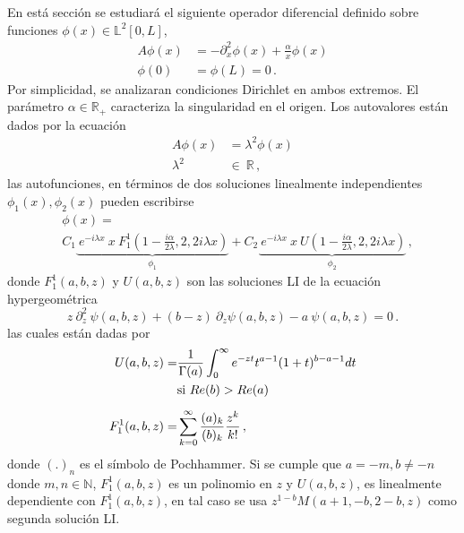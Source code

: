 En está sección se estudiará el siguiente operador diferencial definido sobre funciones $\phi (x)\in \mathbb{L} ^2 [0,L]$,
\begin{equation}
\begin{aligned}
    A \phi (x) &= - \partial ^2 _x  \phi(x) + \frac{\alpha}{x} \phi(x) \\[5pt]
    \phi(0) &= \phi(L) = 0 \, .
\end{aligned}
\label{operador}
\end{equation}
Por simplicidad, se analizaran condiciones Dirichlet en ambos extremos.  El parámetro $\alpha \in \mathbb{R _{+}}$ caracteriza la singularidad en el origen.
Los autovalores están dados por la ecuación 
\begin{equation}
\begin{aligned}
    A  \phi (x)  &=   \lambda ^2 \phi (x) \\[5pt]
    \lambda ^2 \ &\in \ \mathbb{R}  
    \, ,
\end{aligned}
\label{eq.aut.sin}
\end{equation}
las autofunciones, en términos de dos soluciones linealmente independientes $\phi _1 (x), \phi _2 (x)$ pueden escribirse
\begin{align}
\label{eq.phi}
&
    \phi (x) =
\\
&
	    C _1
    	\underbrace{
				     \ e ^{-i \lambda x} \ x \ 
				     F _{1} ^{1} 
				     		\left(  
				     			1 - \frac{i \alpha}
				     			{2\lambda}
				     		,2,2 i \lambda x \right) 
				     } _ {\phi_1} + 
      C _2 
      \underbrace{ 
      			   \ e^{-i \lambda x } \ x \ 
      			   U 
      			   	\left( 
      			   		1- \frac{i \alpha}{2 \lambda}
      			   		,2,2 i \lambda x \right) } _{\phi_2} 
    \, ,
\nonumber
\end{align}
donde $F _1 ^1(a,b,z)$ y $ U(a,b,z)$ son las soluciones LI de la ecuación {\mbox{hypergeométrica} }
\begin{equation}
    z \ \partial ^2 _z \ \psi (a,b,z) + (b-z) \
    \partial _z \psi (a,b,z)
    -a \ \psi (a,b,z) = 0 \, .
\end{equation}
las cuales están dadas por \cite{Abramowitz:hyper}
\begin{align}
	U(a,b,z) = &\frac{1}{\Gamma (a)} 
	\int _0 ^{\infty} e ^{-zt}
	t ^{a-1}
	(1+t) ^{b-a-1}
	dt \\
	& {\rm si \ } Re (b) > Re(a) 
	\nonumber
	\\[5pt]
	F _1 ^1 (a,b,z) =& \sum _ {k=0} ^{\infty} 
	\frac{(a) _k}{(b) _k} 
	\frac{z ^k}{k!} 
	\, ,
\end{align}
donde $(.) _n$ es el símbolo de Pochhammer.
Si se cumple que  $a=-m,b \neq -n$ donde $ m,n \in \mathbb{N}$, $F _1 ^1 (a,b,z)$ es un polinomio en $z$ y $U(a,b,z)$, es linealmente dependiente con $F _1 ^1 (a,b,z)$, en tal caso se usa $z^{1-b} M(a+1,-b,2-b,z)$ como segunda solución LI.


